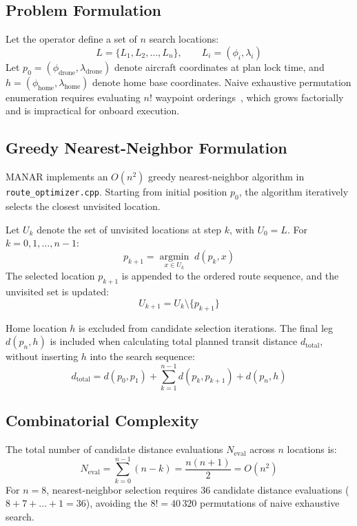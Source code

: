 \subsection{Problem Formulation}
Let the operator define a set of $n$ search locations:
\begin{equation}
L = \{L_1, L_2, \dots, L_n\}, \qquad L_i = (\phi_i, \lambda_i)
\end{equation}
Let $p_0 = (\phi_{\mathrm{drone}}, \lambda_{\mathrm{drone}})$ denote aircraft coordinates at plan lock time, and $h = (\phi_{\mathrm{home}}, \lambda_{\mathrm{home}})$ denote home base coordinates. Naive exhaustive permutation enumeration requires evaluating $n!$ waypoint orderings~\cite{applegate2006traveling}, which grows factorially and is impractical for onboard execution.

\subsection{Greedy Nearest-Neighbor Formulation}
MANAR implements an $O(n^2)$ greedy nearest-neighbor algorithm in \texttt{route\_optimizer.cpp}. Starting from initial position $p_0$, the algorithm iteratively selects the closest unvisited location.

Let $U_k$ denote the set of unvisited locations at step $k$, with $U_0 = L$. For $k = 0, 1, \dots, n-1$:
\begin{equation}
p_{k+1} = \underset{x \in U_k}{\operatorname{argmin}} \; d(p_k, x)
\end{equation}
The selected location $p_{k+1}$ is appended to the ordered route sequence, and the unvisited set is updated:
\begin{equation}
U_{k+1} = U_k \setminus \{p_{k+1}\}
\end{equation}

Home location $h$ is excluded from candidate selection iterations. The final leg $d(p_n, h)$ is included when calculating total planned transit distance $d_{\mathrm{total}}$, without inserting $h$ into the search sequence:
\begin{equation}
d_{\mathrm{total}} = d(p_0, p_1) + \sum_{k=1}^{n-1} d(p_k, p_{k+1}) + d(p_n, h)
\end{equation}

\subsection{Combinatorial Complexity}
The total number of candidate distance evaluations $N_{\mathrm{eval}}$ across $n$ locations is:
\begin{equation}
N_{\mathrm{eval}} = \sum_{k=0}^{n-1} (n - k) = \frac{n(n+1)}{2} = O(n^2)
\end{equation}
For $n = 8$, nearest-neighbor selection requires 36 candidate distance evaluations ($8+7+\dots+1=36$), avoiding the $8! = 40\,320$ permutations of naive exhaustive search.

